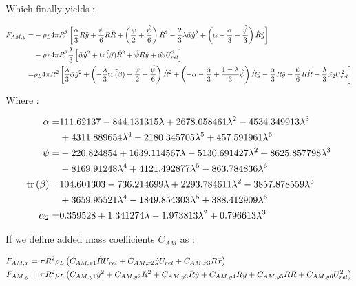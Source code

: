 Which finally yields : 

\begin{align}
\nonumber F_{AM,y}=&-\rho_{L}4\pi R^{2}\left[ \frac{\alpha}{3}R\ddot{y}+\frac{\psi}{6}R \ddot{R} + \left( \frac{\psi}{2} +\frac{\tilde{\psi}}{6} \right)\dot{R}^{2} -\frac{2}{3}\lambda \tilde{\alpha} \dot{y}^{2} + \left(  \alpha + \frac{\tilde{\alpha}}{3} - \frac{\tilde{\psi}}{3}  \right)\dot{R}\dot{y}  \right] \\
&-\rho_{L}4\pi R^{2}\frac{\lambda}{3}\left[ \tilde{\alpha}\dot{y}^{2}+\tilde{\mathrm{tr}\left( \beta \right)}\dot{R}^{2}+\tilde{\psi}\dot{R}\dot{y}+\tilde{\alpha_{2}}U_{rel}^{2} \right]\\
=&\rho_{L}4\pi R^{2}\left[ \frac{\lambda}{3}\tilde{\alpha}\dot{y}^{2}+\left( -\frac{\lambda}{3}\tilde{\mathrm{tr}\left( \beta \right)}-\frac{\psi}{2}-\frac{\tilde{\psi}}{6} \right)\dot{R}^2+\left( -\alpha - \frac{\tilde{\alpha}}{3}+\frac{1-\lambda}{3}\tilde{\psi} \right)\dot{R} \dot{y} - \frac{\alpha}{3}R\ddot{y} - \frac{\psi}{6}R \ddot{R}-\frac{\lambda}{3}\tilde{\alpha_{2}}U_{rel}^{2}  \right]  
\end{align}

Where :

\begin{align}
\nonumber \alpha = &111.62137 - 844.131315 \lambda + 2678.058461 \lambda^{2} - 4534.349913 \lambda^{3} \\ &+ 4311.889654 \lambda^{4} - 2180.345705 \lambda^{5} + 457.591961 \lambda^{6}\\
\nonumber \psi = &-220.824854 + 1639.114567 \lambda - 5130.691427 \lambda^{2} + 8625.857798 \lambda^{3} \\ &- 8169.91248 \lambda^{4} + 4121.492877 \lambda^{5} - 863.784836 \lambda^{6}\\
\nonumber \mathrm{tr}\left( \beta \right) = &104.601303 - 736.214699 \lambda + 2293.784611 \lambda^{2} - 3857.878559 \lambda^{3} \\ &+ 3659.95521 \lambda^{4} - 1849.854303 \lambda^{5} + 388.412909 \lambda^{6}\\
\alpha_{2}= &0.359528 + 1.341274 \lambda - 1.973813 \lambda^{2} + 0.796613 \lambda^{3}
\end{align}


If we define added mass coefficients $C_{AM}$ as :

\begin{align}
F_{AM,x}&=\pi R^{2}\rho_{L}\left( C_{AM,x1}\dot{R}U_{rel}+C_{AM,x2}\dot{y}U_{rel}+C_{AM,x3}R\ddot{x} \right)\\
F_{AM,y}&=\pi R^{2}\rho_{L}\left( C_{AM,y1}\dot{y}^{2}+C_{AM,y2}\dot{R}^{2}+C_{AM,y3}\dot{R}\dot{y}+C_{AM,y4}R\ddot{y} + C_{AM,y5}R\ddot{R}+C_{AM,y6}U_{rel}^{2} \right)
\end{align}

